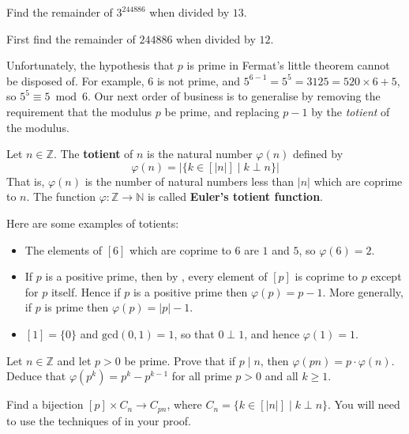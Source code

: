 \begin{exercise}
\label{RemainderOfThreeExpBigRemThirteen}
Find the remainder of $3^{244886}$ when divided by $13$.
\begin{backhint}
First find the remainder of $244886$ when divided by $12$.
\end{backhint}
\end{exercise}

Unfortunately, the hypothesis that $p$ is prime in Fermat's little theorem cannot be disposed of. For example, $6$ is not prime, and $5^{6-1} = 5^5 = 3125 = 520 \times 6 + 5$, so $5^5 \equiv 5 \bmod 6$. Our next order of business is to generalise  by removing the requirement that the modulus $p$ be prime, and replacing $p-1$ by the \textit{totient} of the modulus.

\begin{definition}
\label{defTotient}
Let $n \in \mathbb{Z}$. The \textbf{totient} of $n$ is the natural number $\varphi(n)$  defined by
\[ \varphi(n) = | \{ k \in [ |n| ] \mid k \perp n \}| \]
That is, $\varphi(n)$ is the number of natural numbers less than $|n|$ which are coprime to $n$. The function $\varphi : \mathbb{Z} \to \mathbb{N}$ is called \textbf{Euler's totient function}.
\end{definition}

\begin{example}
\label{exComputationsOfTotients}
Here are some examples of totients:
\begin{itemize}
\item The elements of $[6]$ which are coprime to $6$ are $1$ and $5$, so $\varphi(6)=2$.
\item If $p$ is a positive prime, then by , every element of $[p]$ is coprime to $p$ except for $p$ itself. Hence if $p$ is a positive prime then $\varphi(p)=p-1$. More generally, if $p$ is prime then $\varphi(p) = |p|-1$.
\item $[1] = \{ 0 \}$ and $\mathrm{gcd}(0,1) = 1$, so that $0 \perp 1$, and hence $\varphi(1) = 1$.
\end{itemize}
\end{example}

\begin{exercise}
\label{exTotientMultiplyByPrime}
Let $n \in \mathbb{Z}$ and let $p > 0$ be prime. Prove that if $p \mid n$, then $\varphi(pn) = p \cdot \varphi(n)$. Deduce that $\varphi(p^k) = p^k-p^{k-1}$ for all prime $p>0$ and all $k \ge 1$.
\begin{backhint}
Find a bijection $[p] \times C_n \to C_{pn}$, where $C_n = \{ k \in [|n|] \mid k \perp n \}$. You will need to use the techniques of  in your proof.
\end{backhint}
\end{exercise}

